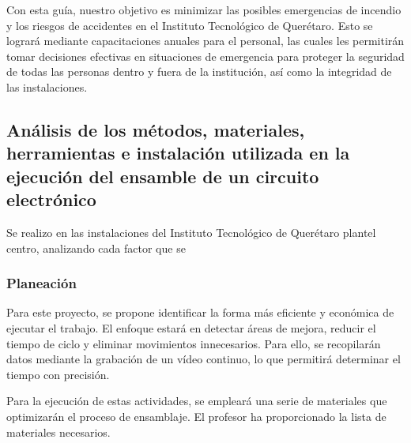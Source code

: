     
    Con esta guía, nuestro objetivo es minimizar las posibles emergencias de incendio y los riesgos de accidentes en el Instituto Tecnológico de Querétaro. Esto se logrará mediante capacitaciones anuales para el personal, las cuales les permitirán tomar decisiones efectivas en situaciones de emergencia para proteger la seguridad de todas las personas dentro y fuera de la institución, así como la integridad de las instalaciones.
    \subsection{Análisis de los métodos, materiales, herramientas e instalación utilizada en la ejecución del ensamble de un circuito electrónico}
    
    Se realizo en las instalaciones del Instituto Tecnológico de Querétaro plantel centro, analizando cada factor que se
    
    \subsubsection{Planeación}
    
    Para este proyecto, se propone identificar la forma más eficiente y económica de ejecutar el trabajo. El enfoque estará en detectar áreas de mejora, reducir el tiempo de ciclo y eliminar movimientos innecesarios. Para ello, se recopilarán datos mediante la grabación de un vídeo continuo, lo que permitirá determinar el tiempo con precisión.
    
    Para la ejecución de estas actividades, se empleará una serie de materiales que optimizarán el proceso de ensamblaje. El profesor ha proporcionado la lista de materiales necesarios.
    
